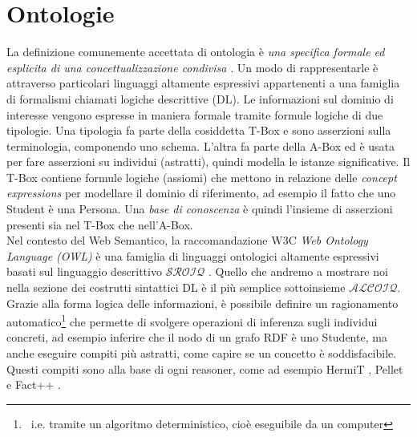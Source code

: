 \section[Ontologie]{Ontologie}
La definizione comunemente accettata di ontologia è \textit{una specifica formale ed esplicita di una concettualizzazione condivisa} \cite{goy2015ontologies}. Un modo di rappresentarle è attraverso particolari linguaggi altamente espressivi appartenenti a una famiglia di formalismi chiamati logiche descrittive (DL). Le informazioni sul dominio di interesse vengono espresse in maniera formale tramite formule logiche di due tipologie. Una tipologia fa parte della cosiddetta T-Box e sono asserzioni sulla terminologia, componendo uno schema. L'altra fa parte della A-Box ed è usata per fare asserzioni su individui (astratti), quindi modella le istanze significative. Il T-Box contiene formule logiche (assiomi) che mettono in relazione delle \textit{concept expressions} per modellare il dominio di riferimento, ad esempio il fatto che  uno Student è una Persona. Una \textit{base di conoscenza} è quindi l'insieme di asserzioni presenti sia nel T-Box che nell'A-Box.\\
Nel contesto del Web Semantico, la raccomandazione W3C \textit{Web Ontology Language (OWL)} è una famiglia di linguaggi ontologici altamente espressivi basati sul linguaggio descrittivo $\mathcal{SROIQ}$ \cite{baader2017introductionDL}. Quello che andremo a mostrare noi nella sezione dei costrutti sintattici DL è il più semplice sottoinsieme $\mathcal{ALCOIQ}$.
Grazie alla forma logica delle informazioni, è possibile definire un ragionamento automatico\footnote{\ i.e. tramite un algoritmo deterministico, cioè eseguibile da un computer} che permette di svolgere operazioni di inferenza sugli individui concreti, ad esempio inferire che il nodo  di un grafo RDF è uno Studente, ma anche eseguire compiti più astratti, come capire se un concetto è soddisfacibile. Questi compiti sono alla base di ogni reasoner, come ad esempio HermiT \cite{HermiT}, Pellet \cite{Pellet} e Fact++ \cite{Fact++}.\\

